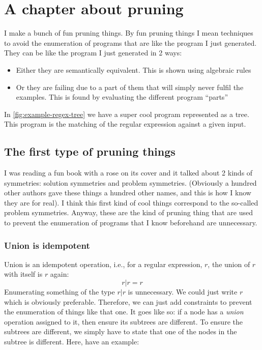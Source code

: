 \chapter{A chapter about pruning}

I make a bunch of fun pruning things. By fun pruning things I mean techniques to avoid the enumeration of programs that are like the program I just generated. They can be like the program I just generated in 2 ways:
\begin{itemize}
    \item Either they are semantically equivalent. This is shown using algebraic rules
    \item Or they are failing due to a part of them that will simply never fulfil the examples. This is found by evaluating the different program ``parts''
\end{itemize}{}

In \autoref{fig:example-regex-tree} we have a super cool program represented as a tree. This program is the matching of the regular expression  against a given input.



\section{The first type of pruning things}

I was reading a fun book with a rose on its cover and it talked about 2 kinds of symmetries: solution symmetries and problem symmetries. (Obviously a hundred other authors gave these things a hundred other names, and this is how I know they are for real). I think this first kind of cool things correspond to the so-called problem symmetries. Anyway, these are the kind of pruning thing that are used to prevent the enumeration of programs that I know beforehand are unnecessary.

\subsection{Union is idempotent}
Union is an idempotent operation, i.e., for a regular expression, \(r\), the union of \(r\) with itself is \(r\) again:
%
\[r | r = r\]
%
Enumerating something of the type \(r|r\) is unnecessary. We could just write \(r\) which is obviously preferable. Therefore, we can just add constraints to prevent the enumeration of things like that one. It goes like so: if a node has a \textit{union} operation assigned to it, then ensure its subtrees are different. To ensure the subtrees are different, we simply have to state that one of the nodes in the subtree is different. Here, have an example:

